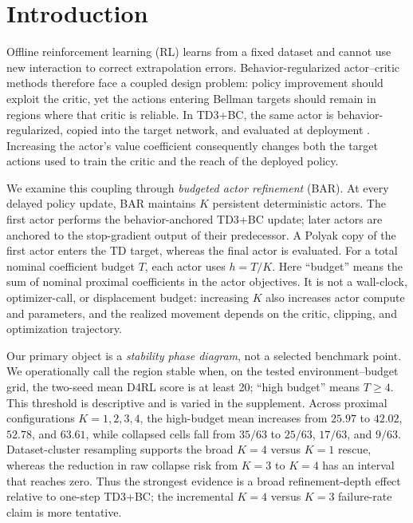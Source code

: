 \section{Introduction}
\label{sec:introduction}

Offline reinforcement learning (RL) learns from a fixed dataset and cannot use new interaction to correct extrapolation errors. Behavior-regularized actor--critic methods therefore face a coupled design problem: policy improvement should exploit the critic, yet the actions entering Bellman targets should remain in regions where that critic is reliable. In TD3+BC, the same actor is behavior-regularized, copied into the target network, and evaluated at deployment \citep{fujimoto2021minimalist}. Increasing the actor's value coefficient consequently changes both the target actions used to train the critic and the reach of the deployed policy.

We examine this coupling through \emph{budgeted actor refinement} (BAR). At every delayed policy update, BAR maintains $K$ persistent deterministic actors. The first actor performs the behavior-anchored TD3+BC update; later actors are anchored to the stop-gradient output of their predecessor. A Polyak copy of the first actor enters the TD target, whereas the final actor is evaluated. For a total nominal coefficient budget $T$, each actor uses $h=T/K$. Here ``budget'' means the sum of nominal proximal coefficients in the actor objectives. It is not a wall-clock, optimizer-call, or displacement budget: increasing $K$ also increases actor compute and parameters, and the realized movement depends on the critic, clipping, and optimization trajectory.

Our primary object is a \emph{stability phase diagram}, not a selected benchmark point. We operationally call the region stable when, on the tested environment--budget grid, the two-seed mean D4RL score is at least 20; ``high budget'' means $T\geq4$. This threshold is descriptive and is varied in the supplement. Across proximal configurations $K=1,2,3,4$, the high-budget mean increases from $25.97$ to $42.02$, $52.78$, and $63.61$, while collapsed cells fall from $35/63$ to $25/63$, $17/63$, and $9/63$. Dataset-cluster resampling supports the broad $K=4$ versus $K=1$ rescue, whereas the reduction in raw collapse risk from $K=3$ to $K=4$ has an interval that reaches zero. Thus the strongest evidence is a broad refinement-depth effect relative to one-step TD3+BC; the incremental $K=4$ versus $K=3$ failure-rate claim is more tentative.

